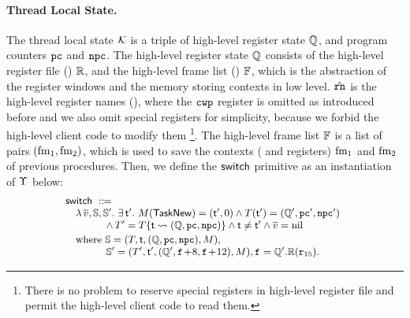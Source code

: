 \paragraph{\textbf{Thread Local State.}}
The thread local state $\mathcal{K}$
is a triple of high-level register state
 $\mathbb{Q}$,
and program counters $\texttt{pc}$ and $\texttt{npc}$. The high-level
register state $\mathbb{Q}$ consists of
the high-level register file () $\mathbb{R}$,
and the high-level frame list () $\mathbb{F}$, 
which is the abstraction of the register windows and the memory 
storing contexts in low level.
$\hat{\texttt{rn}}$ is the high-level register names (), 
where the $\texttt{cwp}$ register is omitted as introduced before and
we also omit special registers for simplicity,
because we forbid
the high-level client code to modify them
\footnote{There is no problem to reserve special
registers in high-level register file and permit
the high-level client code to read them.}.
The high-level frame list $\mathbb{F}$ is a list of pairs
$(\text{fm}_1, \text{fm}_2)$, which is used to save
the contexts (\localRN{} and \inRN{} registers)
$\text{fm}_1$ and $\text{fm}_2$ of previous procedures.
Then, we define the $\mathsf{switch}$ primitive as
an instantiation of $\Upsilon$ below:
\[
    \small\!\!
    \begin{array}{l}
        \primsw \ \define \\
        \quad
        \lambda \, \args{\val}, \hpstate, \hpstate'. \
        \exists \, \thrdid'. \
        \Mem(\TaskNew) = (\thrdid', 0) \land
        \thrdpool(\thrdid') =
            (\hRstate', \pc', \npc') \\
        \qquad\qquad
        \land \,
        \thrdpool' = \thrdpool\{ \thrdid \rightsquigarrow
            (\hRstate, \pc, \npc) \}
            \land \tid \neq \tid' \land \args{\val} = \nil \\
        \\[-9pt]
        \quad \text{where} \
        \hpstate =
            (\thrdpool, \thrdid, (\hRstate, \pc, \npc), \Mem), \\
        \qquad\qquad
        \hpstate' =
            (\thrdpool', \thrdid',
                (\hRstate', \lab{}\!+\!8, \lab{}\!+\!12), \Mem),
                \lab{} = \hRstate'.\hRfile(\reg{15}).
    \end{array}
\]
